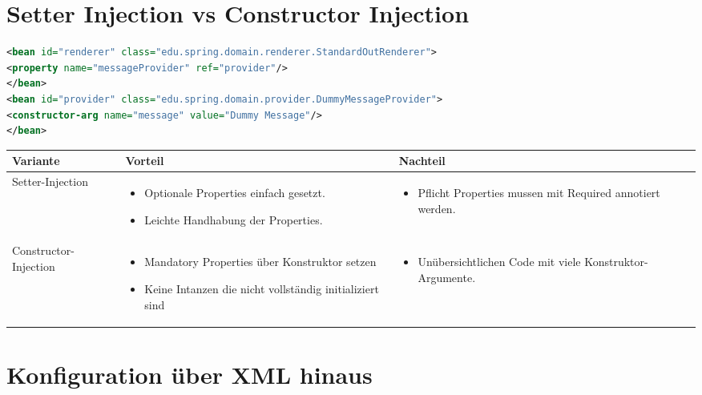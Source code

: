 \documentclass[a4paper,10pt]{scrreprt}
\begin{document}
\section{Setter Injection vs Constructor Injection}

\begin{lstlisting}[language=xml,caption=Die zwei Arten von Injection]
 <bean id="renderer" class="edu.spring.domain.renderer.StandardOutRenderer">
<property name="messageProvider" ref="provider"/>
</bean>
<bean id="provider" class="edu.spring.domain.provider.DummyMessageProvider">
<constructor-arg name="message" value="Dummy Message"/>
</bean>

\end{lstlisting}

\begin{tabular}{|l|p{7cm}|p{7cm}|}
\hline
 \textbf{Variante} & \textbf{Vorteil} & \textbf{Nachteil} \\ \hline
 Setter-Injection & \begin{itemize}
                     \item Optionale Properties einfach gesetzt.
                     \item Leichte Handhabung der Properties.
                    \end{itemize} &
                    \begin{itemize}
                     \item Pflicht Properties mussen mit Required annotiert werden.
                    \end{itemize} \\ \hline
 Constructor-Injection & \begin{itemize}
                          \item Mandatory Properties über Konstruktor setzen
                           \item Keine Intanzen die nicht vollständig initializiert sind
                         \end{itemize}& 
                         \begin{itemize}
                          \item Unübersichtlichen Code mit viele Konstruktor-Argumente.
                         \end{itemize} \\ \hline
\end{tabular}

\section{Konfiguration über XML hinaus}
\end{document}
